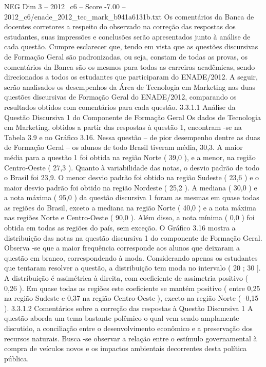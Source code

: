 \begin{textsample}{NEG Dim 3 – 2012\_c6 – Score -7.00 – 2012\_c6/enade\_2012\_tec\_mark\_b941a6131b.txt}
Os comentários da Banca de docentes corretores a respeito do observado na correção das respostas dos estudantes, suas impressões e conclusões serão apresentados junto à análise de cada questão.
Cumpre esclarecer que, tendo em vista que as questões discursivas de Formação Geral são padronizadas, ou seja, constam de todas as provas, os comentários da Banca são os mesmos para todas as carreiras acadêmicas, sendo direcionados a todos os estudantes que participaram do ENADE/2012.
A seguir, serão analisados os desempenhos da Área de Tecnologia em Marketing nas duas questões discursivas de Formação Geral do ENADE/2012, comparando os resultados obtidos com comentários para cada questão. 3.3.1.1 Análise da Questão Discursiva 1 do Componente de Formação Geral Os dados de Tecnologia em Marketing, obtidos a partir das respostas à questão 1, encontram -se na Tabela 3.9 e no Gráfico 3.16.
Nessa questão – de pior desempenho dentre as duas de Formação Geral – os alunos de todo Brasil tiveram média, 30,3.
A maior média para a questão 1 foi obtida na região Norte ( 39,0 ), e a menor, na região Centro-Oeste ( 27,3 ).
Quanto à variabilidade das notas, o desvio padrão de todo o Brasil foi 23,9.
O menor desvio padrão foi obtido na região Sudeste ( 23,6 ) e o maior desvio padrão foi obtido na região Nordeste ( 25,2 ).
A mediana ( 30,0 ) e a nota máxima ( 95,0 ) da questão discursiva 1 foram as mesmas em quase todas as regiões do Brasil, exceto a mediana na região Norte ( 40,0 ) e a nota máxima nas regiões Norte e Centro-Oeste ( 90,0 ).
Além disso, a nota mínima ( 0,0 ) foi obtida em todas as regiões do país, sem exceção.
O Gráfico 3.16 mostra a distribuição das notas na questão discursiva 1 do componente de Formação Geral.
Observa -se que a maior frequência corresponde aos alunos que deixaram a questão em branco, correspondendo à moda.
Considerando apenas os estudantes que tentaram resolver a questão, a distribuição tem moda no intervalo ( 20 ; 30 ].
A distribuição é assimétrica à direita, com coeficiente de assimetria positivo ( 0,26 ).
Em quase todas as regiões este coeficiente se mantém positivo ( entre 0,25 na região Sudeste e 0,37 na região Centro-Oeste ), exceto na região Norte ( -0,15 ). 3.3.1.2 Comentários sobre a correção das respostas à Questão Discursiva 1 A questão aborda um tema bastante polêmico o qual vem sendo amplamente discutido, a conciliação entre o desenvolvimento econômico e a preservação dos recursos naturais.
Busca -se observar a relação entre o estímulo governamental à compra de veículos novos e os impactos ambientais decorrentes desta política pública.

\end{textsample}

